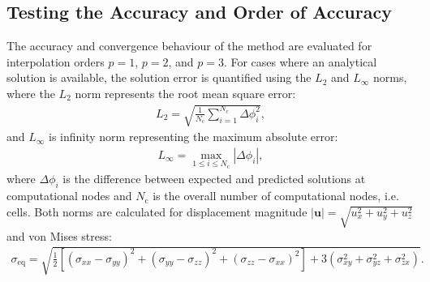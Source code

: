 \documentclass[sn-mathphys,Numbered]{sn-jnl}%
\begin{document}
\subsection{Testing the Accuracy and Order of Accuracy}
%
The accuracy and convergence behaviour of the method are evaluated for interpolation orders $p = 1$, $p = 2$, and $p = 3$.
For cases where an analytical solution is available, the solution error is quantified using the $L_2$ and $L_\infty$ norms,
where the $L_2$ norm represents the root mean square error:
\begin{eqnarray}
L_2 = \sqrt{\frac{1}{N_{\text{c}}}\sum_{i=1}^{N_{\text{c}}} \Delta \phi_i^2},
\end{eqnarray}
and $L_\infty$ is infinity norm representing the maximum absolute error:
\begin{eqnarray}
L_{\infty} = \max_{1 \leq i \leq N_{\text{c}}} |\Delta \phi_i|,
\end{eqnarray}
where $\Delta \phi_i$ is the difference between expected and predicted solutions at computational nodes and $N_{\text{c}}$ is the overall number of computational nodes, i.e. cells.
Both norms are calculated for displacement magnitude $|\boldsymbol{u}|=\sqrt{u_x^2+u_y^2+u_z^2}$ and von Mises stress:
\begin{eqnarray}
\sigma_\text{eq}=\sqrt{\frac{1}{2}\left[  (\sigma_{xx}-\sigma_{yy})^2+(\sigma_{yy}-\sigma_{zz})^2+(\sigma_{zz}-\sigma_{xx})^2 \right]+3\left(\sigma_{xy}^2+\sigma_{yz}^2+\sigma_{zx}^2\right)}.
\end{eqnarray}
%
\end{document}

